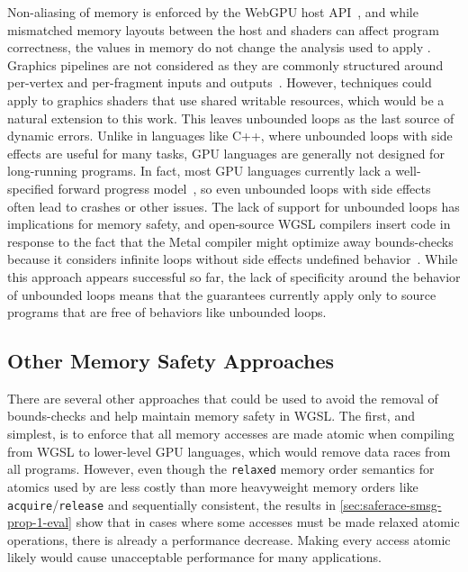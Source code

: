 Non-aliasing of memory is enforced by the WebGPU host API~\cite[]{webgpu}, and while mismatched memory layouts between the host and shaders can affect program correctness, the values in memory do not change the analysis used to apply \smsg. Graphics pipelines are not considered as they are commonly structured around per-vertex and per-fragment inputs and outputs~\cite[, 13.3.1--13.3.2]{wgslspec}. However, \smsg techniques could apply to graphics shaders that use shared writable resources, which would be a natural extension to this work. This leaves unbounded loops as the last source of dynamic errors. Unlike in languages like C++, where unbounded loops with side effects are useful for many tasks, GPU languages are generally not designed for long-running programs. In fact, most GPU languages currently lack a well-specified forward progress model~\cite{sorensen2021progress}, so even unbounded loops with side effects often lead to crashes or other issues. The lack of support for unbounded loops has implications for memory safety, and open-source WGSL compilers insert code in response to the fact that the Metal compiler might optimize away bounds-checks because it considers infinite loops without side effects undefined behavior~\cite{wgpuIssue4972}. While this approach appears successful so far, the lack of specificity around the behavior of unbounded loops means that the \smsg guarantees currently apply only to source programs that are free of behaviors like unbounded loops.

\subsection{Other Memory Safety Approaches}

There are several other approaches that could be used to avoid the removal of bounds-checks and help maintain memory safety in WGSL. The first, and simplest, is to enforce that all memory accesses are made atomic when compiling from WGSL to lower-level GPU languages, which would remove data races from all programs. However, even though the \texttt{relaxed} memory order semantics for atomics used by \smsg are less costly than more heavyweight memory orders like \texttt{acquire}/\texttt{release} and sequentially consistent, the results in \mysec\ref{sec:saferace-smsg-prop-1-eval} show that in cases where some accesses must be made relaxed atomic operations, there is already a performance decrease. Making every access atomic likely would cause unacceptable performance for many applications.

